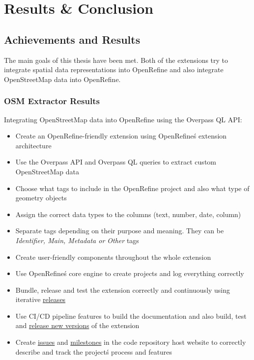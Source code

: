 \chapter{Results \& Conclusion}\label{ch:results-&-conclusion}
\section{Achievements and Results}
The main goals of this thesis have been met. Both of the extensions try to integrate spatial data representations into
OpenRefine and also integrate OpenStreetMap data into OpenRefine.
\subsection{OSM Extractor Results}
Integrating OpenStreetMap data into OpenRefine using the Overpass QL API:
\begin{itemize}
    \item Create an OpenRefine-friendly extension using OpenRefine\'s extension architecture
    \item Use the Overpass API and Overpass QL queries to extract custom OpenStreetMap data
    \item Choose what tags to include in the OpenRefine project and also what type of geometry objects
    \item Assign the correct data types to the columns (text, number, date, column)
    \item Separate tags depending on their purpose and meaning. They can be \textit{Identifier, Main, Metadata or Other} tags
    \item Create user-friendly components throughout the whole extension
    \item Use OpenRefine\'s core engine to create projects and log everything correctly
    \item Bundle, release and test the extension correctly and continuously using iterative \href{https://gitlab.com/labiangashi/osm-extractor/-/releases}{releases}
    \item Use CI/CD pipeline features to build the documentation and also build, test and \href{https://gitlab.com/labiangashi/osm-extractor/-/releases}{release new versions} of the extension
    \item Create \href{https://gitlab.com/labiangashi/osm-extractor/-/issues}{issues} and
    \href{https://gitlab.com/labiangashi/osm-extractor/-/milestones}{milestones} in the code repository host website to correctly describe and
    track the project\'s process and features
\end{itemize}
